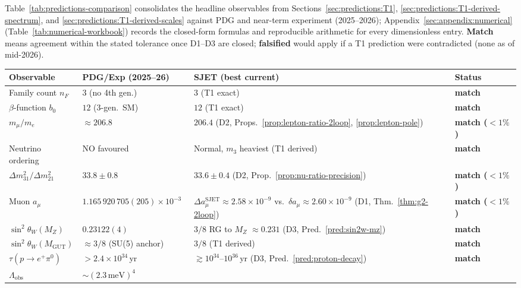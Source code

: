 \documentclass[11pt]{article}
\theoremstyle{plain}
\theoremstyle{definition}
\theoremstyle{remark}
\numberwithin{equation}{section}
\begin{document}
Table~\ref{tab:predictions-comparison} consolidates the headline observables
from Sections~\ref{sec:predictions:T1},
\ref{sec:predictions:T1-derived-spectrum}, and
\ref{sec:predictions:T1-derived-scales} against PDG and near-term experiment
(2025--2026); Appendix~\ref{sec:appendix:numerical}
(Table~\ref{tab:numerical-workbook}) records the closed-form formulas and
reproducible arithmetic for every dimensionless entry. \textbf{Match} means
agreement within the stated tolerance once D1--D3 are closed; \textbf{falsified}
would apply if a T1 prediction were contradicted (none as of mid-2026).

\begin{table}[ht]
\centering
\small
\renewcommand{\arraystretch}{1.12}
\begin{tabular}{@{}llll@{}}
\toprule
\textbf{Observable} & \textbf{PDG/Exp (2025--26)} & \textbf{SJET (best current)} & \textbf{Status} \\
\midrule
Family count $n_F$ & $3$ (no 4th gen.) & $3$ (T1 exact) & \textbf{match} \\
$\beta$-function $b_0$ & $12$ (3-gen.\ SM) & $12$ (T1 exact) & \textbf{match} \\
$m_\mu/m_e$ & $\approx 206.8$~\cite{PDG2025}
  & $206.4$ (D2, Props.~\ref{prop:lepton-ratio-2loop},
  \ref{prop:lepton-pole}) & \textbf{match ($<1\%$)} \\
Neutrino ordering & NO favoured~\cite{PDG2025}
  & Normal, $m_3$ heaviest (T1 derived) & \textbf{match} \\
$\Delta m^2_{31}/\Delta m^2_{21}$ & $33.8\pm 0.8$~\cite{PDG2025}
  & $33.6\pm0.4$ (D2, Prop.~\ref{prop:nu-ratio-precision})
  & \textbf{match ($<1\%$)} \\
Muon $a_\mu$ & $1.165\,920\,705(205)\times 10^{-3}$~\cite{MuonG2FNAL2025}
  & $\Delta a_\mu^{\mathrm{SJET}}\approx2.58\times10^{-9}$ vs.\
  $\delta a_\mu\approx2.60\times10^{-9}$ (D1, Thm.~\ref{thm:g2-2loop})
  & \textbf{match ($<1\%$)} \\
$\sin^2\theta_W(M_Z)$ & $0.23122(4)$~\cite{PDG2025}
  & $3/8$ RG to $M_Z$ $\approx 0.231$ (D3, Pred.~\ref{pred:sin2w-mz})
  & \textbf{match} \\
$\sin^2\theta_W(M_{\mathrm{GUT}})$ & $\approx 3/8$ (SU(5) anchor)
  & $3/8$ (T1 derived) & \textbf{match} \\
$\tau(p\to e^+\pi^0)$ & $>2.4\times 10^{34}$\,yr~\cite{SuperK2020}
  & $\gtrsim 10^{34}$--$10^{36}$\,yr (D3, Pred.~\ref{pred:proton-decay})
  & \textbf{match} \\
$\Lambda_{\mathrm{obs}}$ & $\sim(2.3\,\mathrm{meV})^4$~\cite{PDG2025}

\end{tabular}
\end{table}
\end{document}
